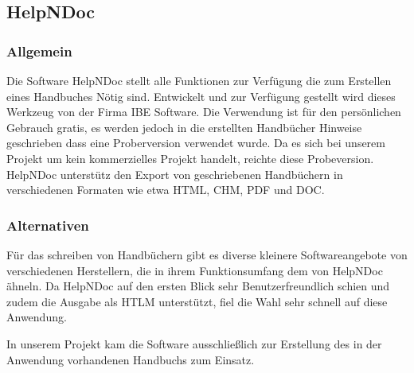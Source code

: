 \subsection{HelpNDoc}
\subsubsection{Allgemein}
Die Software HelpNDoc stellt alle Funktionen zur Verfügung die zum Erstellen eines Handbuches Nötig sind. Entwickelt und zur Verfügung gestellt wird dieses Werkzeug von der Firma IBE Software. Die Verwendung ist für den persönlichen Gebrauch gratis, es werden jedoch in die erstellten Handbücher Hinweise geschrieben dass eine Proberversion verwendet wurde. Da es sich bei unserem Projekt um kein kommerzielles Projekt handelt, reichte diese Probeversion.
HelpNDoc unterstütz den Export von geschriebenen Handbüchern in verschiedenen Formaten wie etwa HTML, CHM, PDF und DOC. 

\subsubsection{Alternativen}
Für das schreiben von Handbüchern gibt es diverse kleinere Softwareangebote von verschiedenen Herstellern, die in ihrem Funktionsumfang dem von HelpNDoc ähneln. Da HelpNDoc auf den ersten Blick sehr Benutzerfreundlich schien und zudem die Ausgabe als HTLM unterstützt, fiel die Wahl sehr schnell auf diese Anwendung.

In unserem Projekt kam die Software ausschließlich zur Erstellung des in der Anwendung vorhandenen Handbuchs zum Einsatz.